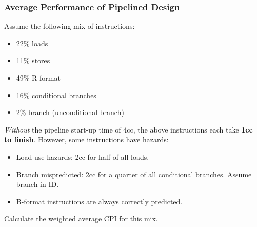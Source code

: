\begin{frame}\frametitle{Average Performance of Pipelined Design}
\begin{tcolorbox}[enhanced,attach boxed title to top center={yshift=-3mm,yshifttext=-1mm},
  colback=red!5!white,colframe=red!75!black,colbacktitle=red!80!black,
  title=Try this,fonttitle=\bfseries,
  boxed title style={size=small,colframe=red!50!black} ]  
Assume the following mix of instructions:

\begin{multicols}{2}
    
\begin{itemize}
\item 22\% loads
\item 11\% stores
\item 49\% R-format
\columnbreak

\item 16\% conditional branches
\item 2\% branch (unconditional branch)
\end{itemize}
\end{multicols}

\emph{Without} the pipeline start-up time of 4cc, the above instructions each take \textbf{1cc to finish}. However, some instructions have hazards:
\begin{itemize}
\item Load-use hazards: 2cc for half of all loads.
\item Branch mispredicted: 2cc for a quarter of all conditional branches. Assume branch in ID.
\item B-format instructions are always correctly predicted.
\end{itemize}

Calculate the weighted average CPI for this mix.
\end{tcolorbox}


\end{frame}

